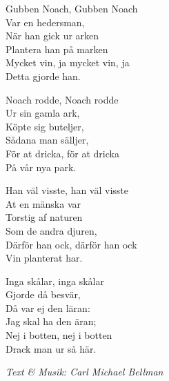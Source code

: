 \vspace{10pt}
\revrpt Gubben Noach, Gubben Noach\\ 
Var en hedersman,\rpt \\ 
När han gick ur arken\\ 
Plantera han på marken\\ 
Mycket vin, ja mycket vin, ja\\ 
Detta gjorde han.\par
\vspace{10pt}
\revrpt Noach rodde, Noach rodde\\ 
Ur sin gamla ark,\rpt \\ 
Köpte sig buteljer,\\ 
Sådana man sälljer,\\ 
För at dricka, för at dricka\\ 
På vår nya park.\par
\vspace{10pt}
\revrpt Han väl visste, han väl visste\\ 
At en mänska var\rpt \\ 
Torstig af naturen\\ 
Som de andra djuren,\\ 
Därför han ock, därför han ock\\ 
Vin planterat har.\par
\vspace{10pt}
\revrpt Inga skålar, inga skålar\\ 
Gjorde då besvär,\rpt \\ 
Då var ej den läran:\\ 
Jag skal ha den äran;\\ 
Nej i botten, nej i botten\\ 
Drack man ur så här.\par
\vspace{10pt}
{\footnotesize\textit{Text \& Musik: Carl Michael Bellman}} 
